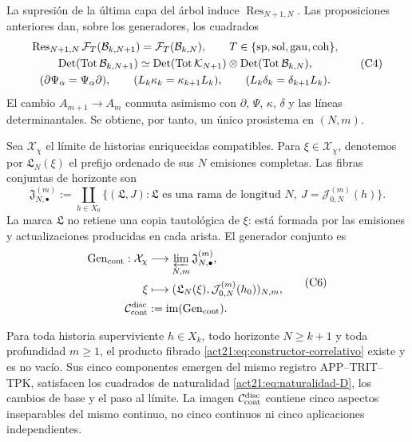 La supresión de la última capa del árbol induce
\(\operatorname{Res}_{N+1,N}\). Las proposiciones anteriores dan, sobre los
generadores, los cuadrados
\[
\begin{gathered}
 \operatorname{Res}_{N+1,N}\mathcal F_T(\mathcal B_{k,N+1})
 =\mathcal F_T(\mathcal B_{k,N}),
 \qquad T\in\{{\rm sp},{\rm sol},{\rm gau},{\rm coh}\},\\
 \operatorname{Det}(\operatorname{Tot}\mathcal B_{k,N+1})
 \simeq
 \operatorname{Det}(\operatorname{Tot}\mathcal K_{N+1})
 \otimes
 \operatorname{Det}(\operatorname{Tot}\mathcal B_{k,N}),\\
 (\partial\Psi_\alpha=\Psi_\alpha\partial),\qquad
 (L_k\kappa_k=\kappa_{k+1}L_k),\qquad
 (L_k\delta_k=\delta_{k+1}L_k).
\end{gathered}
 \tag{C4}
 \label{act21:eq:naturalidad-D}
\]
El cambio \(A_{m+1}\to A_m\) conmuta asimismo con \(\partial\), \(\Psi\),
\(\kappa\), \(\delta\) y las líneas determinantales. Se obtiene, por tanto,
un único prosistema en \((N,m)\).

Sea \(\mathcal X_\chi\) el límite de historias enriquecidas compatibles. Para
\(\xi\in\mathcal X_\chi\), denotemos por \(\mathfrak L_N(\xi)\) el prefijo
ordenado de sus \(N\) emisiones completas. Las fibras conjuntas de horizonte
son
\[
 \mathfrak J_{N,\bullet}^{(m)}
 :=\coprod_{h\in X_0}
 \{(\mathfrak L,J):\mathfrak L\text{ es una rama de longitud }N,
       \ J=\mathcal J_{0,N}^{(m)}(h)\}.
 \tag{C5}
 \label{act21:eq:fibras-conjuntas-horizonte}
\]
La marca \(\mathfrak L\) no retiene una copia tautológica de \(\xi\): está
formada por las emisiones y actualizaciones producidas en cada arista. El
generador conjunto es
\[
\begin{aligned}
 \operatorname{Gen}_{\rm cont}:\mathcal X_\chi
   &\longrightarrow\varprojlim_{N,m}\mathfrak J_{N,\bullet}^{(m)},\\
 \xi&\longmapsto
   (\mathfrak L_N(\xi),\mathcal J_{0,N}^{(m)}(h_0))_{N,m},\\
 \mathcal C_{\rm cont}^{\rm disc}
   &:=\operatorname{im}(\operatorname{Gen}_{\rm cont}).
\end{aligned}
 \tag{C6}
 \label{act21:eq:continuo-discreto}
\]

\begin{theorem}
\label{act21:thm:correlacion-cinco}
Para toda historia superviviente \(h\in X_k\), todo horizonte
\(N\geq k+1\) y toda profundidad \(m\geq1\), el producto fibrado
\eqref{act21:eq:constructor-correlativo} existe y es no vacío. Sus cinco
componentes emergen del mismo registro APP--TRIT--TPK, satisfacen los
cuadrados de naturalidad \eqref{act21:eq:naturalidad-D}, los cambios de base y el
paso al límite. La imagen \(\mathcal C_{\rm cont}^{\rm disc}\) contiene cinco
aspectos inseparables del mismo continuo, no cinco continuos ni cinco
aplicaciones independientes.
\end{theorem}

